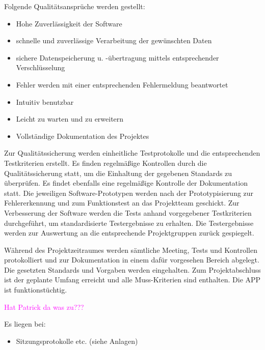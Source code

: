 Folgende Qualitätsansprüche werden gestellt:
\begin{itemize}
	\item Hohe Zuverlässigkeit der Software
	\item schnelle und zuverlässige Verarbeitung der gewünschten Daten
	\item sichere Datenspeicherung u. -übertragung mittels entsprechender Verschlüsselung
	\item Fehler werden mit einer entsprechenden Fehlermeldung beantwortet
	\item Intuitiv benutzbar
	\item Leicht zu warten und zu erweitern
	\item Vollständige Dokumentation des Projektes
\end{itemize}




Zur Qualitätssicherung werden einheitliche Testprotokolle und die entsprechenden Testkriterien erstellt. Es finden regelmäßige Kontrollen durch die Qualitätssicherung statt, um die Einhaltung der gegebenen Standards zu überprüfen. Es findet ebenfalls eine regelmäßige Kontrolle der Dokumentation statt. Die jeweiligen Software-Prototypen werden nach der Prototypisierung zur Fehlererkennung und zum Funktionstest an das Projektteam geschickt. Zur Verbesserung der Software werden die Tests anhand vorgegebener Testkriterien durchgeführt, um standardisierte Testergebnisse zu erhalten. Die Testergebnisse werden zur Auswertung an die entsprechende Projektgruppen zurück gespiegelt.


Während des Projektzeitraumes werden sämtliche Meeting, Tests und Kontrollen protokolliert und zur Dokumentation in einem dafür vorgesehen Bereich abgelegt. Die gesetzten Standards und Vorgaben werden eingehalten. Zum Projektabschluss ist der geplante Umfang erreicht und alle Muss-Kriterien sind enthalten. Die APP ist funktionstüchtig.



\textcolor{magenta}{Hat Patrick da was zu???}



Es liegen bei:
\begin{itemize}
	\item Sitzungsprotokolle etc. (siehe Anlagen)
\end{itemize}



